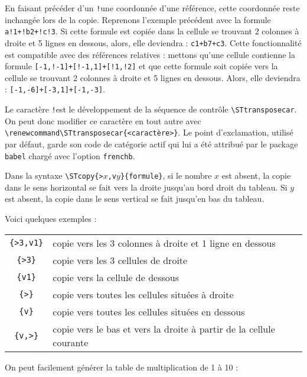 \documentclass[a4paper,10pt]{article}
\newcommand\verbinline[1][]{\lstinline[breaklines=false,basicstyle=\normalsize\ttfamily,#1]}
\begin{document}
En faisant précéder d'un \og\verb-!-\fg une coordonnée d'une référence, cette coordonnée reste inchangée lors de la copie. Reprenons l'exemple précédent avec la formule \verb-a!1+!b2+!c!3-. Si cette formule est copiée dans la cellule se trouvant 2 colonnes à droite et 5 lignes en dessous, alors, elle deviendra : \verb-c1+b7+c3-. Cette fonctionnalité est compatible avec des références relatives : mettons qu'une cellule contienne la formule \verb|[-1,!-1]+[!-1,1]+[!1,!2]| et que cette formule soit copiée vers la cellule se trouvant 2 colonnes à droite et 5 lignes en dessous. Alors, elle deviendra : \verb|[-1,-6]+[-3,1]+[-1,-3]|.

Le caractère \og\verb-!-\fg est le développement de la séquence de contrôle \verbinline-\STtransposecar-. On peut donc modifier ce caractère en tout autre avec \verbinline-\renewcommand\STtransposecar-\verb-{<caractère>}-. Le point d'exclamation, utilisé par défaut, garde son code de catégorie actif qui lui a été attribué par le package \verb-babel- chargé avec l'option \verb-frenchb-.

Dans la syntaxe \verbinline-\STcopy{>-$x$\verbinline-,v-$y$\verbinline-}{formule}-, si le nombre $x$ est absent, la copie dans le sens horizontal se fait vers la droite jusqu'au bord droit du tableau. Si $y$ est absent, la copie dans le sens vertical se fait jusqu'en bas du tableau.

Voici quelques exemples :
\begin{tabular}{cl}\hline
\verb-{>3,v1}- & copie vers les 3 colonnes à droite et 1 ligne en dessous\\
\verb-{>3}- & copie vers les 3 cellules de droite\\
\verb-{v1}- & copie vers la cellule de dessous\\
\verb-{>}- & copie vers toutes les cellules situées à droite\\
\verb-{v}- & copie vers toutes les cellules situées en dessous\\
\verb-{v,>}- & copie vers le bas et vers la droite à partir de la cellule courante\\\hline
\end{tabular}

On peut facilement générer la table de multiplication de 1 à 10 :
\end{document}

